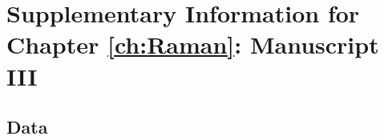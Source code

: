 \chapter{Supplementary Information for Chapter \ref{ch:Raman}: Manuscript III}
\label{appendix: Raman}
\acresetall

\section{Data}
